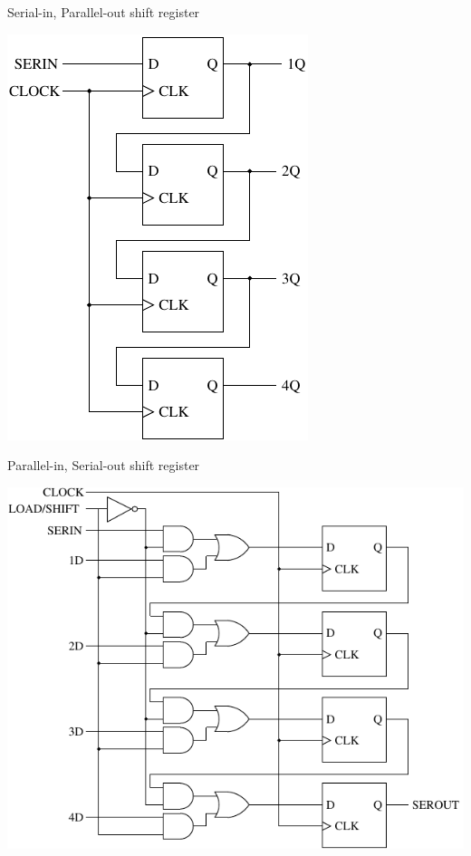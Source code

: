 \begin{frame}{Serial-in, Parallel-out shift register}
  \begin{center}
    \includegraphics[scale=0.9]{SerialInParallelOutShiftRegister}
  \end{center}
\end{frame}

\begin{frame}{Parallel-in, Serial-out shift register}
  \begin{center}
    \includegraphics[scale=0.8]{ParallelInSerialOutShiftRegister}
  \end{center}
\end{frame}

